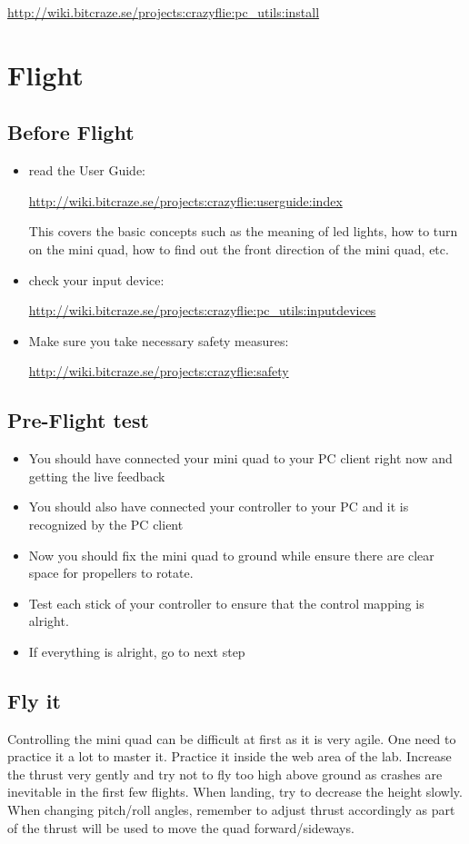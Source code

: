\documentclass[11pt]{article}
\begin{document}
\url{http://wiki.bitcraze.se/projects:crazyflie:pc\_utils:install}


\section{Flight}
\subsection{Before Flight}
\begin{itemize}
\item read the User Guide: 

\url{http://wiki.bitcraze.se/projects:crazyflie:userguide:index}

This covers the basic concepts such as the meaning of led lights, how to turn on the mini quad, how to find out the front direction of the mini quad, etc.
\item check your input device: 

\url{http://wiki.bitcraze.se/projects:crazyflie:pc\_utils:inputdevices}
\item Make sure you take necessary safety measures: 

\url{http://wiki.bitcraze.se/projects:crazyflie:safety}
\end{itemize}

\subsection{Pre-Flight test}
\begin{itemize}
\item You should have connected your mini quad to your PC client right now and getting the live feedback
\item You should also have connected your controller to your PC and it is recognized by the PC client
\item Now you should fix the mini quad to ground while ensure there are clear space for propellers to rotate.
\item Test each stick of your controller to ensure that the control mapping is alright.
\item If everything is alright, go to next step
\end{itemize}

\subsection{Fly it}
Controlling the mini quad can be difficult at first as it is very agile. 
One need to practice it a lot to master it. Practice it inside the web area of the lab. 
Increase the thrust very gently and try not to fly too high above ground as crashes are inevitable in the first few flights.
When landing, try to decrease the height slowly.
When changing pitch/roll angles, remember to adjust thrust accordingly as part of the thrust will be used to move the quad forward/sideways.
\end{document}
